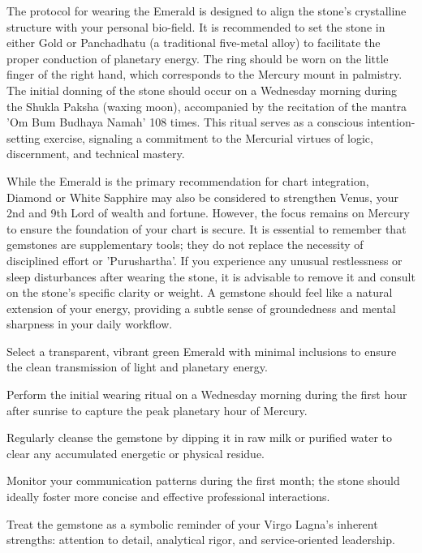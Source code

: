 {\fontsize{9}{13}\selectfont The protocol for wearing the Emerald is designed to align the stone's crystalline structure with your personal bio-field. It is recommended to set the stone in either Gold or Panchadhatu (a traditional five-metal alloy) to facilitate the proper conduction of planetary energy. The ring should be worn on the little finger of the right hand, which corresponds to the Mercury mount in palmistry. The initial donning of the stone should occur on a Wednesday morning during the Shukla Paksha (waxing moon), accompanied by the recitation of the mantra 'Om Bum Budhaya Namah' 108 times. This ritual serves as a conscious intention-setting exercise, signaling a commitment to the Mercurial virtues of logic, discernment, and technical mastery.}\par\vspace{1.8mm}

{\fontsize{9}{13}\selectfont While the Emerald is the primary recommendation for chart integration, Diamond or White Sapphire may also be considered to strengthen Venus, your 2nd and 9th Lord of wealth and fortune. However, the focus remains on Mercury to ensure the foundation of your chart is secure. It is essential to remember that gemstones are supplementary tools; they do not replace the necessity of disciplined effort or 'Purushartha'. If you experience any unusual restlessness or sleep disturbances after wearing the stone, it is advisable to remove it and consult on the stone's specific clarity or weight. A gemstone should feel like a natural extension of your energy, providing a subtle sense of groundedness and mental sharpness in your daily workflow.}\par\vspace{1.8mm}

\begin{diamondlist}
  \item {\fontsize{8.5}{12}\selectfont Select a transparent, vibrant green Emerald with minimal inclusions to ensure the clean transmission of light and planetary energy.}
  \item {\fontsize{8.5}{12}\selectfont Perform the initial wearing ritual on a Wednesday morning during the first hour after sunrise to capture the peak planetary hour of Mercury.}
  \item {\fontsize{8.5}{12}\selectfont Regularly cleanse the gemstone by dipping it in raw milk or purified water to clear any accumulated energetic or physical residue.}
  \item {\fontsize{8.5}{12}\selectfont Monitor your communication patterns during the first month; the stone should ideally foster more concise and effective professional interactions.}
  \item {\fontsize{8.5}{12}\selectfont Treat the gemstone as a symbolic reminder of your Virgo Lagna's inherent strengths: attention to detail, analytical rigor, and service-oriented leadership.}
\end{diamondlist}

